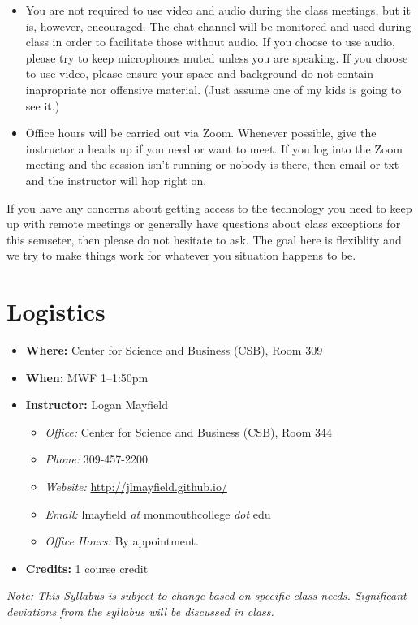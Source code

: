 \documentclass[10pt]{article}
\begin{document}
\begin{itemize}
  \item You are not required to use video and audio during the class meetings, but it is,
  however, encouraged. The chat channel will be monitored and used during class in order
  to facilitate those without audio. If you choose to use audio, please try to keep
  microphones muted unless you are speaking. If you choose to use video, please ensure
  your space and background do not contain inapropriate nor offensive material. (Just
  assume one of my kids is going to see it.)

  \item Office hours will be carried out via Zoom. Whenever possible, give the
  instructor a heads up if you need or want to meet. If you log into the Zoom meeting
  and the session isn't running or nobody is there, then email or txt and the instructor
  will hop right on.

\end{itemize}

If you have any concerns about getting access to the technology you need to keep up with
remote meetings or generally have questions about class exceptions for this semseter,
then please do not hesitate to ask. The goal here is flexiblity and we try to make
things work for whatever you situation happens to be.


\section{Logistics}
\begin{itemize}
\item \textbf{Where: } Center for Science and Business (CSB), Room 309\footnotemark[1]
\item \textbf{When: } MWF 1--1:50pm
\item \textbf{Instructor: } Logan Mayfield
\begin{itemize}
\item \textit{Office: } Center for Science and Business (CSB), Room 344
\item \textit{Phone: } 309-457-2200 %
\item \textit{Website: } \url{http://jlmayfield.github.io/}
\item \textit{Email: } lmayfield \textit{at} monmouthcollege \textit{dot} edu
\item \textit{Office Hours: }  By appointment.
\end{itemize}
\item \textbf{Credits: } 1 course credit
\end{itemize}
\emph{Note: This Syllabus is subject to change based on specific class needs. Significant deviations from the syllabus will be discussed in class.}
\end{document}
